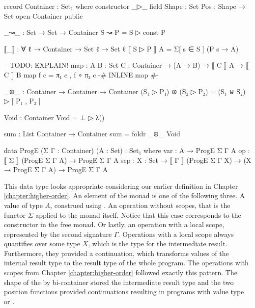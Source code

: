 \begin{code}[hide]
record Container : Set₁ where
  constructor _▷_
  field
    Shape : Set
    Pos : Shape → Set
open Container public

_↝_ : Set → Set → Container
S ↝ P = S ▷ const P

⟦_⟧ : ∀ {ℓ} → Container → Set ℓ → Set ℓ
⟦ S ▷ P ⟧ A = Σ[ s ∈ S ] (P s → A)

-- TODO: EXPLAIN!
map : {A B : Set} {C : Container} → (A → B) → ⟦ C ⟧ A → ⟦ C ⟧ B
map f c = π₁ c , f ∘ π₂ c
{-# INLINE map #-}

_⊕_ : Container → Container → Container
(S₁ ▷ P₁) ⊕ (S₂ ▷ P₂) = (S₁ ⊎ S₂) ▷ [ P₁ , P₂ ]

Void : Container
Void = ⊥ ▷ λ()

sum : List Container → Container
sum = foldr _⊕_ Void

\end{code}
\begin{code}
data ProgE (Σ Γ : Container) (A : Set) : Set₁ where
  var  : A                                                    → ProgE Σ Γ A
  op   : ⟦ Σ ⟧ (ProgE Σ Γ A)                                  → ProgE Σ Γ A
  scp  : {X : Set} → ⟦ Γ ⟧ (ProgE Σ Γ X) → (X → ProgE Σ Γ A)  → ProgE Σ Γ A
\end{code}
This data type looks appropriate considering our earlier definition in Chapter
\ref{chapter:higher-order}.
An element of the monad is one of the following three.
A value of type $A$, construed using .
An operation without scopes, that is the functor $\Sigma$ applied to the monad
itself.
Notice that this case corresponds to the 
constructor in the free monad.
Or lastly, an operation with a local scope, represented by the second signature
$\Gamma$.
Operations with a local scope always quantifies over some type $X$, which is the
type for the intermediate result.
Furthermore, they provided a continuation, which transforms values of the
internal result type to the result type of the whole program.
The operations with scopes from Chapter \ref{chapter:higher-order} followed
exactly this pattern.
The shape of the by bi-container stored the intermediate result type and the two
position functions provided continuations resulting in programs with value type
 or .

